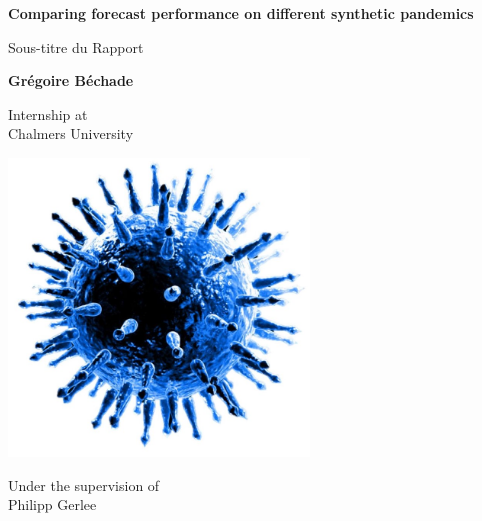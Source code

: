\documentclass[11pt,a4paper]{article}
\begin{document}
\begin{titlepage}
    \begin{center}
        \vspace*{1cm}
        
        \Huge
        \textbf{Comparing forecast performance on different synthetic pandemics}
        
        \vspace{0.5cm}
        \LARGE
        Sous-titre du Rapport
        
        \vspace{1.5cm}
        
        \textbf{Grégoire Béchade}
        
        \vfill
        
        \Large
        Internship at \\
        Chalmers University
        
        \vspace{0.8cm}
        
        \includegraphics[width=0.6\textwidth]{figures/le virus_découpé_bis.jpg}
        
        \vfill
        
        \Large
        Under the supervision of \\
        Philipp Gerlee
        
        \vspace{0.8cm}
        
    \end{center}
\end{titlepage}

\newpage
\thispagestyle{empty}
\mbox{}
\newpage

\tableofcontents
\newpage







\newpage
\printbibliography %
\newpage

\end{document}
